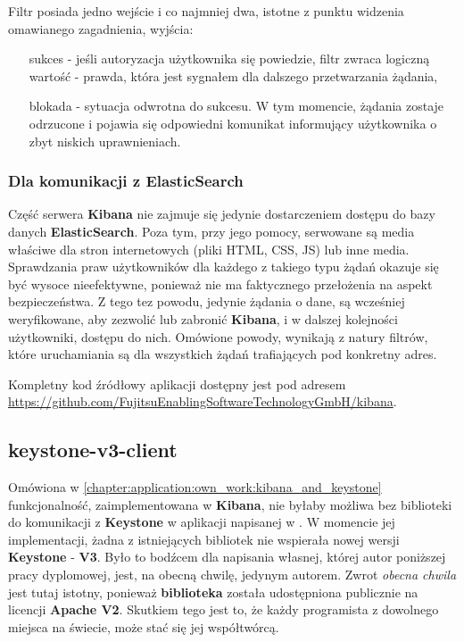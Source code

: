     Filtr posiada jedno wejście i co najmniej dwa, istotne z punktu widzenia omawianego zagadnienia, wyjścia:
    \begin{itemize}
        \item[sukces] - jeśli autoryzacja użytkownika się powiedzie, filtr zwraca logiczną wartość - prawda,
        która jest sygnałem dla dalszego przetwarzania żądania,
        \item[blokada] - sytuacja odwrotna do sukcesu. W tym momencie, żądania zostaje odrzucone
        i pojawia się odpowiedni komunikat informujący użytkownika o zbyt niskich uprawnieniach.
    \end{itemize}
    
    \subsubsection{Dla komunikacji z ElasticSearch}
    Część serwera \textbf{Kibana} nie zajmuje się jedynie dostarczeniem dostępu do bazy danych
    \textbf{ElasticSearch}. Poza tym, przy jego pomocy, serwowane są media właściwe dla stron internetowych
    (pliki HTML, CSS, JS) lub inne media. Sprawdzania praw użytkowników dla
    każdego z takiego typu żądań okazuje się być wysoce nieefektywne, ponieważ nie ma faktycznego
    przełożenia na aspekt bezpieczeństwa. Z tego tez powodu, jedynie żądania o dane, są wcześniej 
    weryfikowane, aby zezwolić lub zabronić \textbf{Kibana}, i w dalszej kolejności użytkowniki,
    dostępu do nich. Omówione powody, wynikają z natury filtrów, które uruchamiania są dla 
    wszystkich żądań trafiających pod konkretny adres.

Kompletny kod źródłowy aplikacji dostępny jest pod adresem \url{https://github.com/FujitsuEnablingSoftwareTechnologyGmbH/kibana}.

\subsection{keystone-v3-client}
Omówiona w \ref{chapter:application:own_work:kibana_and_keystone} funkcjonalność, zaimplementowana w \textbf{Kibana}, nie byłaby możliwa
bez biblioteki do komunikacji z \textbf{Keystone} w aplikacji napisanej w .
W momencie jej implementacji, żadna z istniejących bibliotek nie wspierała nowej wersji \textbf{Keystone} - \textbf{V3}. 
Było to bodźcem dla napisania własnej, której autor poniższej pracy dyplomowej, jest, na obecną chwilę, jedynym autorem. Zwrot \textit{obecna chwila}
jest tutaj istotny, ponieważ \textbf{biblioteka} została udostępniona publicznie na licencji \textbf{Apache V2}. Skutkiem tego jest to, że
każdy programista z dowolnego miejsca na świecie, może stać się jej współtwórcą. 

